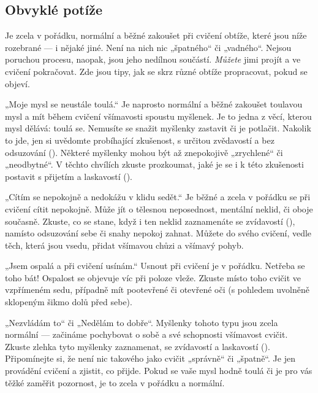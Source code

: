 \subsection{Obvyklé potíže}
	Je zcela v pořádku, normální a běžné zakoušet při cvičení obtíže, které jsou níže rozebrané — i nějaké jiné. Není na nich nic „špatného“ či „vadného“. Nejsou poruchou procesu, naopak, jsou jeho nedílnou součástí. \emph{Můžete} jimi projít a ve cvičení pokračovat. Zde jsou tipy, jak se skrz různé obtíže propracovat, pokud se objeví.
	\begin{description*}
		\item[„Moje mysl se neustále toulá.“] Je naprosto normální a běžné zakoušet toulavou mysl a mít během cvičení všímavosti spoustu myšlenek. Je to jedna z věcí, kterou mysl dělává: toulá se. Nemusíte se snažit myšlenky zastavit či je potlačit. Nakolik to jde, jen si uvědomte probíhající zkušenost, s určitou zvědavostí a bez odsuzování (). Některé myšlenky mohou být až znepokojivě „zrychlené“ či „neodbytné“. V těchto chvílích zkuste prozkoumat, jaké je se i k této zkušenosti postavit s přijetím a laskavostí ().
		\item[„Cítím se nepokojně a nedokážu v klidu sedět.“] Je běžné a zcela v pořádku se při cvičení cítit nepokojně. Může jít o tělesnou neposednost, mentální neklid, či oboje současně. Zkuste, co se stane, když i ten neklid zaznamenáte se zvídavostí (), namísto odsuzování sebe či snahy nepokoj zahnat. Můžete do svého cvičení, vedle těch, která jsou vsedu, přidat všímavou chůzi a všímavý pohyb.
		\item[„Jsem ospalá a při cvičení usínám.“] Usnout při cvičení je v pořádku. Netřeba se toho bát! Ospalost se objevuje víc při poloze vleže. Zkuste místo toho cvičit ve vzpřímeném sedu, případně mít pootevřené či otevřené oči (s pohledem uvolněně sklopeným šikmo dolů před sebe).
		\item[„Nezvládám to“ či „Nedělám to dobře“.] Myšlenky tohoto typu jsou zcela normální — začináme pochybovat o sobě a své schopnosti všímavost cvičit. Zkuste zlehka tyto myšlenky zaznamenat, se zvídavostí a laskavostí (). Připomínejte si, že není nic takového jako cvičit „správně“ či „špatně“. Je jen provádění cvičení a zjistit, co přijde. Pokud se vaše mysl hodně toulá či je pro vás těžké zaměřit pozornost, je to zcela v pořádku a normální.

\end{description*}
